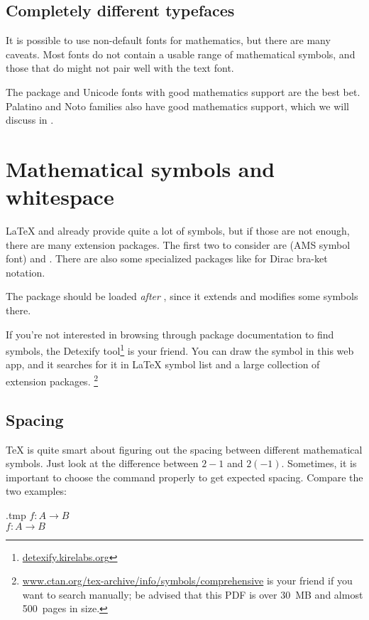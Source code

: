 %
%
\subsection{Completely different typefaces}

It is possible to use non-default fonts for mathematics,
but there are many caveats.
Most fonts do not contain a usable range of mathematical symbols,
and those that do might not pair well with the text font.

The  package and Unicode fonts with good mathematics support are the best bet.
Palatino and Noto families also have good mathematics support,
which we will discuss in .



%
%
%
\section{Mathematical symbols and whitespace}

\LaTeX{} and  already provide quite a lot of symbols,
but if those are not enough, there are many extension packages.
The first two to consider are  (AMS symbol font)
and .
There are also some specialized packages like  for Dirac bra-ket notation.

\begin{gotcha}
The  package should be loaded \emph{after} ,
since it extends and modifies some symbols there.
\end{gotcha}

If you're not interested in browsing through package documentation to find symbols,
the Detexify tool\footnote{\url{detexify.kirelabs.org}} is your friend.
You can draw the symbol in this web app,
and it searches for it in \LaTeX{} symbol list and a large collection of extension packages.%
\footnote{\url{www.ctan.org/tex-archive/info/symbols/comprehensive}
is your friend if you want to search manually;
be advised that this PDF is over 30~MB and almost 500~pages in size.}


%
%
\subsection{Spacing}\label{sec:math spacing}

\TeX{} is quite smart about figuring out the spacing between different mathematical symbols.
Just look at the difference between $2 - 1$ and $2 (-1)$.
Sometimes, it is important to choose the command properly to get expected spacing.
Compare the two examples:
%
\begin{VerbatimOut}{\jobname.tmp}
$f : A \to B$\\
$f \colon A \to B$
\end{VerbatimOut}
\ShowExample

